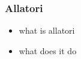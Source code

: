 \subsubsection{Allatori} \label{subsection:counter-obfuscation-solution-allatori}
\begin{itemize}
  \item what is allatori
  \item what does it do
\end{itemize}
